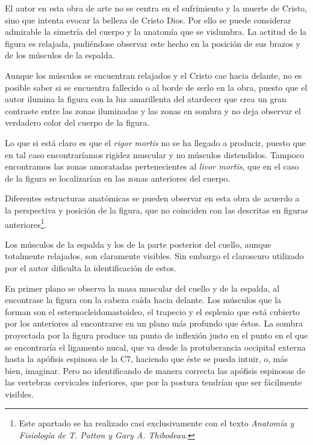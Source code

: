 El autor en esta obra de arte no se centra en el sufrimiento y la muerte de Cristo, sino que intenta evocar la belleza de Cristo Dios. Por ello se puede considerar admirable la simetría del cuerpo y la anatomía que se vislumbra. La actitud de la figura es relajada, pudiéndose observar este hecho en la posición de sus brazos y de los músculos de la espalda.

Aunque los músculos se encuentran relajados y el Cristo cae hacia delante, no es posible saber si se encuentra fallecido o al borde de serlo en la obra, puesto que el autor ilumina la figura con la luz amarillenta del atardecer que crea un gran contraste entre las zonas iluminadas y las zonas en sombra y no deja observar el verdadero color del cuerpo de la figura.

Lo que si está claro es que el \textit{rigor mortis} no se ha llegado a producir, puesto que en tal caso encontraríamos rigidez muscular y no músculos distendidos. Tampoco encontramos las zonas amoratadas pertenecientes al \textit{livor mortis}, que en el caso de la figura se localizarían en las zonas anteriores del cuerpo.

Diferentes estructuras anatómicas se pueden observar en esta obra de acuerdo a la perspectiva y posición de la figura, que no coinciden con las descritas en figuras anteriores\footnote{Este apartado se ha realizado casi exclusivamente con el texto \textit{Anatomía y Fisiología de T. Patton y Gary A. Thibodeau.}\cite{RefWorks:63}}.

Los músculos de la espalda y los de la parte posterior del cuello, aunque totalmente relajados, son claramente visibles. Sin embargo el claroscuro utilizado por el autor dificulta la identificación de estos.


En primer plano se observa la masa muscular del cuello y de la espalda, al encontrase la figura con la cabeza caída hacia delante. Los músculos que la forman son el esternocleidomastoideo, el trapecio y el esplenio que está cubierto por los anteriores al encontrarse en un plano más profundo que éstos. La sombra proyectada por la figura produce un punto de inflexión justo en el punto en el que se encontraría el ligamento nucal, que va desde la protuberancia occipital externa hasta la apófisis espinosa de la C7, haciendo que éste se pueda intuir, o, más bien, imaginar. Pero no identificando de manera correcta las apófisis espinosas de las vertebras cervicales inferiores, que por la postura tendrían que ser fácilmente visibles. 

